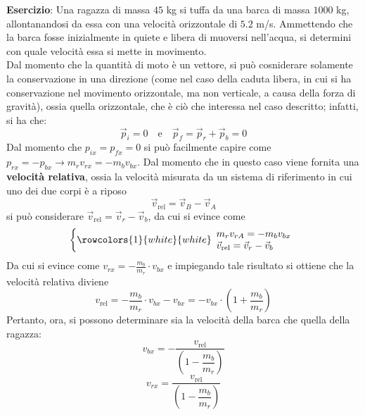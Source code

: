 \documentclass[a4paper]{extarticle}
\begin{document}
\vspace{1em}
\noindent
\textbf{Esercizio}: Una ragazza di massa $45$ kg si tuffa da una barca di massa $1000$ kg, allontanandosi da essa con una velocità orizzontale di $5.2$ m/s. Ammettendo che la barca fosse inizialmente in quiete e libera di muoversi nell'acqua, si determini con quale velocità essa si mette in movimento.\\
Dal momento che la quantità di moto è un vettore, si può cosniderare solamente la conservazione in una direzione (come nel caso della caduta libera, in cui si ha conservazione nel movimento orizzontale, ma non verticale, a causa della forza di gravità), ossia quella orizzontale, che è ciò che interessa nel caso descritto; infatti, si ha che:
\[\vec p_i=0 \hspace{1em} \text{e} \hspace{1em} \vec p_f=\vec p_r + \vec p_b=0\]
Dal momento che $p_{ix}=p_{fx}=0$ si può facilmente capire come $p_{rx}=-p_{bx} \longrightarrow m_r v_{rx} = -m_{b} v_{bx}$. Dal momento che in questo caso viene fornita una \textbf{velocità relativa}, ossia la velocità misurata da un sistema di riferimento in cui uno dei due corpi è a riposo
\[\boxed{\vec v_{\text{rel}} = \vec v_B - \vec v_A}\]
si può considerare $\vec v_{\text{rel}} = \vec v_r - \vec v_b$, da cui si evince come
\[
  \left\{
  \rowcolors{1}{white}{white}
  \begin{array}{l}
    m_r v_{rA} = -m_b v_{bx}\\
    \vec v_{\text{rel}} = \vec v_r - \vec v_b
  \end{array}
  \right.
\]
Da cui si evince come $v_{rx}=-\frac{m_b}{m_r} \cdot v_{bx}$ e impiegando tale risultato si ottiene che la velocità relativa diviene
\[v_{\text{rel}} = -\frac{m_b}{m_r} \cdot v_{bx} - v_{bx} = -v_{bx} \cdot \left(1+\frac{m_b}{m_r}\right)\]
Pertanto, ora, si possono determinare sia la velocità della barca che quella della ragazza:
\[v_{bx}=-\frac{v_{\text{rel}}}{\displaystyle{\left(1-\dfrac{m_b}{m_r}\right)}}\]
\[v_{rx}=\frac{v_{\text{rel}}}{\displaystyle{\left(1-\dfrac{m_b}{m_r}\right)}}\]

\vspace{1em}
\end{document}
